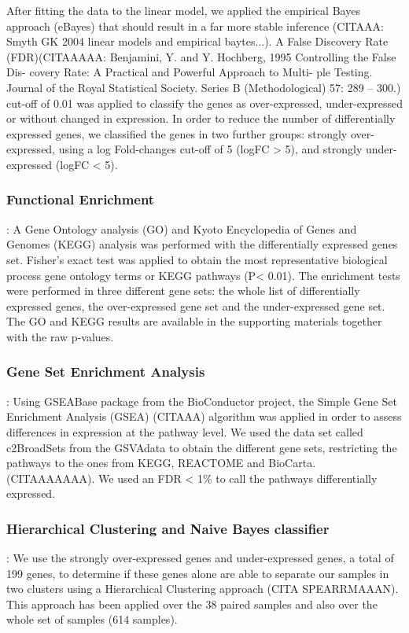 \documentclass[9pt,twocolumn,twoside]{gsajnl}
\begin{document}
After fitting the data to the linear model, we applied the 	empirical Bayes approach (eBayes) that should result in a far more stable inference (CITAAA: Smyth GK 2004 linear models and empirical baytes...). A False Discovery Rate (FDR)(CITAAAAA: Benjamini, Y. and Y. Hochberg, 1995 Controlling the False Dis- covery Rate: A Practical and Powerful Approach to Multi- ple Testing. Journal of the Royal Statistical Society. Series B (Methodological) 57: 289 – 300.) cut-off of 0.01 was applied to classify the genes as over-expressed, under-expressed or without changed in expression. In order to reduce the number of differentially expressed genes, we classified the genes in two further groups: strongly over-expressed, using a log Fold-changes cut-off of 5 (logFC > 5), and strongly under-expressed (logFC < 5). 

\subsubsection*{Functional Enrichment}
: A Gene Ontology analysis (GO) and Kyoto Encyclopedia of Genes and Genomes (KEGG) analysis was performed with the differentially expressed genes set. Fisher's exact test was applied to obtain the most representative biological process gene ontology terms or KEGG pathways (P< 0.01). The enrichment tests were performed in three different gene sets: the whole list of differentially expressed genes, the over-expressed gene set and the under-expressed gene set. The GO and KEGG results are available in the supporting materials together with the raw p-values.

\subsubsection*{Gene Set Enrichment Analysis}
:  Using GSEABase package from the BioConductor project, the Simple Gene Set Enrichment Analysis (GSEA) (CITAAA) algorithm was applied in order to assess differences in  expression at the pathway level. We used the data set called c2BroadSets from the GSVAdata to obtain the different gene sets, restricting the pathways to the ones from KEGG, REACTOME and BioCarta. (CITAAAAAAA). We used an FDR < 1\% to call the pathways differentially expressed.

\subsubsection*{Hierarchical Clustering and Naive Bayes classifier}
: We use the strongly over-expressed genes and under-expressed genes, a total of 199 genes, to determine if these genes alone are able to separate our samples in two clusters using a Hierarchical Clustering approach (CITA SPEARRMAAAN). This approach has been applied over the 38 paired samples and also over the whole set of samples (614 samples).
\end{document}
